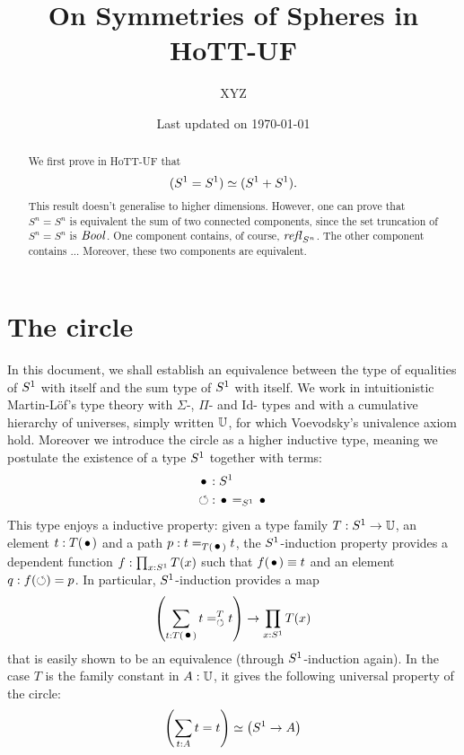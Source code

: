 \documentclass[english,a4]{article}
\title{{On Symmetries of Spheres in HoTT-UF}}%
\author{\normalsize XYZ} %
\date{\normalsize Last updated on \today}%
\def\U{\universe U}%
\begin{document}
\maketitle

\begin{abstract}
  We first prove in HoTT-UF that
  \begin{displaymath}
    ({S^1} = {S^1}) \simeq ({S^1} + {S^1}).
  \end{displaymath}
This result doesn't generalise to higher dimensions.
However, one can prove that $S^n = S^n$ is equivalent the sum of two
connected components, since the set truncation of $S^n = S^n$ is $\mathop{\mathit{Bool}}$. 
One component contains, of course, $\mathop{{\mathit{refl}}_{S^n}}$.
The other component contains ...
Moreover, these two components are equivalent.
\end{abstract}


\section{The circle}
\label{sec:circle-case}%
In this document, we shall establish an equivalence
between the type of equalities of ${S^1}$ with itself and the sum type
of ${S^1}$ with itself. We work in intuitionistic Martin-Löf's type
theory with $\Sigma$-, $\Pi$- and $\mathrm{Id}$- types and with a
cumulative hierarchy of universes, simply written $\U$, for
which Voevodsky's univalence axiom hold. Moreover we introduce the
circle as a higher inductive type, meaning we postulate the existence
of a type ${S^1}$ together with terms:
\begin{align}
  \label{eq:1}
  \base &: \Sc\\
  \Sloop &: \base =_{\Sc} \base
\end{align}
This type enjoys a inductive property: given a type family
$T : \Sc \to \U$, an element $t:T(\base)$ and a path
$p:t=_{T(\base)}t$, the ${S^1}$-induction property provides a dependent
function $f : \prod_{x:{S^1}}T(x)$ such that $f(\base) \jdeq t$ and an
element $q: f(\mathord{\circlearrowleft}) = p$. In particular, ${S^1}$-induction provides a
map
\begin{equation}
  \label{eq:2}
  \left(\sum_{t:T(\base)} \pathover t T \Sloop t\right) \to \prod_{x:\Sc}T(x)
\end{equation}
that is easily shown to be an equivalence (through ${S^1}$-induction
again). In the case $T$ is the family constant in $A:\U$, it gives the
following universal property of the circle:
\begin{equation}
  \label{eq:3}
  \left(\sum_{t:A}t=t\right) \simeq \left( {S^1} \to A \right)
\end{equation}
\end{document}
